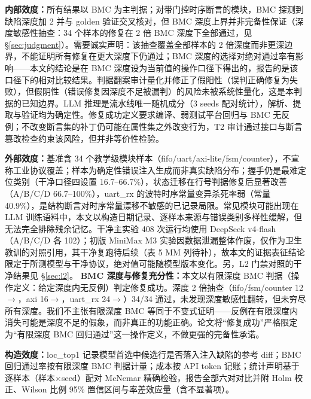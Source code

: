 \documentclass[journal]{IEEEtran}
\begin{document}
\textbf{内部效度：}所有结果以 BMC 为主判据；对带门控时序断言的模块，BMC 探测到缺陷深度加 2 并与 golden 验证交叉核对，但 BMC 深度上界并非完备性保证（深度敏感性抽查：34 个样本的修复在 2 倍 BMC 深度下全部通过，见 \S\ref{sec:judgment}）。需要诚实声明：该抽查覆盖全部样本的 2 倍深度而非更深边界，不能证明所有修复在更大深度下仍通过；BMC 深度的选择对绝对通过率有影响——本文的结论是在 BMC 深度设为当前值的操作口径下得出的，报告的是该口径下的相对比较结果。判据翻案审计量化并修正了假阳性（误判正确修复为失败），但假阴性（错误修复因深度不足被漏判）的风险未被系统性量化，这是本判据的已知边界。LLM 推理是流水线唯一随机成分（3 seeds 配对统计），解析、提取与验证均为确定性。修复成功定义要求编译、弱测试平台回归与 BMC 无反例；不改变断言集的补丁仍可能在属性集之外改变行为，T2 审计通过接口与断言篡改检查约束该风险，但并非等价性检验。

\textbf{外部效度：}基准含 34 个教学级模块样本（fifo/uart/axi-lite/fsm/counter），不宣称工业协议覆盖；样本为确定性错误注入生成而非真实缺陷分布；握手仍是最难定位类别（干净口径四设置 16.7--66.7\%），状态迁移在行号判据修复后显著改善（A/B/C/D 66.7--100\%），uart\_rx 的波特时序常量变异杀死率弱（常量 40.9\%），是结构断言对时序常量漂移不敏感的已记录局限。常见模块可能出现在 LLM 训练语料中，本文以构造日期记录、逐样本来源与错误类别多样性缓解，但无法完全排除残余记忆。干净主实验 408 次运行均使用 DeepSeek v4-flash（A/B/C/D 各 102）；初版 MiniMax M3 实验因数据泄漏整体作废，仅作为卫生教训的对照引用，其干净复跑待后续（表 5 MM 列待补），故本文的证据表征结论限定于所测模型与干净协议，绝对值可能随模型版本变化。另，L2 门禁对照的干净结果见 \S\ref{sec:l2}。
\textbf{BMC 深度与修复充分性：}本文以有限深度 BMC 判据（操作定义：给定深度内无反例）判定修复成功。深度 2 倍抽查（fifo/fsm/counter 12$\to$，axi 16$\to$，uart\_rx 24$\to$）34/34 通过，未发现深度敏感性翻转，但未穷尽所有深度。我们不主张有限深度 BMC 等同于不变式证明——反例在有限深度内消失可能是深度不足的假象，而非真正的功能正确。论文将\textquotedblleft 修复成功\textquotedblright 严格限定为\textquotedblleft 有限深度 BMC 回归通过\textquotedblright 这一操作定义，不做更强的完备性承诺。


\textbf{构造效度：}loc\_top1 记录模型首选中候选行是否落入注入缺陷的参考 diff；BMC 回归通过率按有限深度 BMC 判据计量；成本按 API token 记账；统计声明基于逐样本（样本$\times$seed）配对 McNemar 精确检验，报告全部六对对比并附 Holm 校正、Wilson 比例 95\% 置信区间与率差效应量（含不显著项）。
\end{document}
